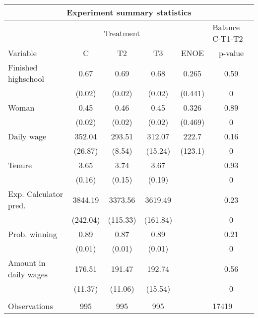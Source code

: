 \begin{tabular}{lccccl}
\toprule
\toprule
\multicolumn{6}{c}{\textbf{Experiment summary statistics}} \\
\midrule
      & \multicolumn{3}{c}{Treatment} &       & Balance C-T1-T2 \\
Variable & C     & T2    & T3    & ENOE  & \multicolumn{1}{c}{p-value} \\
\midrule
Finished highschool & 0.67  & 0.69  & 0.68  & 0.265 & \multicolumn{1}{c}{0.59} \\
      & (0.02) & (0.02) & (0.02) & (0.441) & \multicolumn{1}{c}{0} \\
Woman & 0.45  & 0.46  & 0.45  & 0.326 & \multicolumn{1}{c}{0.89} \\
      & (0.02) & (0.02) & (0.02) & (0.469) & \multicolumn{1}{c}{0} \\
Daily wage & 352.04 & 293.51 & 312.07 & 222.7 & \multicolumn{1}{c}{0.16} \\
      & (26.87) & (8.54) & (15.24) & (123.1) & \multicolumn{1}{c}{0} \\
Tenure & 3.65  & 3.74  & 3.67  &       & \multicolumn{1}{c}{0.93} \\
      & (0.16) & (0.15) & (0.19) &       & \multicolumn{1}{c}{0} \\
Exp. Calculator pred.  & 3844.19 & 3373.56 & 3619.49 &       & \multicolumn{1}{c}{0.23} \\
      & (242.04) & (115.33) & (161.84) &       & \multicolumn{1}{c}{0} \\
Prob. winning & 0.89  & 0.87  & 0.89  &       & \multicolumn{1}{c}{0.21} \\
      & (0.01) & (0.01) & (0.01) &       & \multicolumn{1}{c}{0} \\
Amount in daily wages  & 176.51 & 191.47 & 192.74 &       & \multicolumn{1}{c}{0.56} \\
      & (11.37) & (11.06) & (15.54) &       & \multicolumn{1}{c}{0} \\
      &       &       &       &       &  \\
\midrule
Observations & 995   & 995   & 995   &       & 17419 \\
\bottomrule
\end{tabular}%
